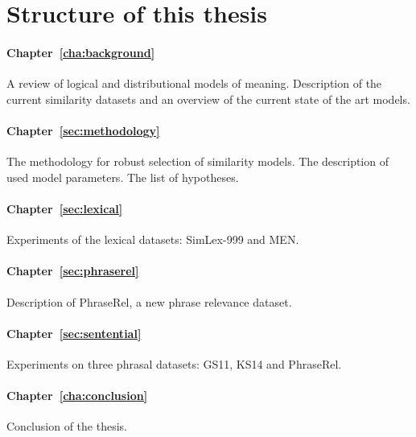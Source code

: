 \section{Structure of this thesis}
\label{sec:structure}

\paragraph{Chapter~\ref{cha:background}} A review of logical and distributional models of meaning. Description of the current similarity datasets and an overview of the current state of the art models.

\paragraph{Chapter~\ref{sec:methodology}} The methodology for robust selection of similarity models. The description of used model parameters. The list of hypotheses.

\paragraph{Chapter~\ref{sec:lexical}} Experiments of the lexical datasets: SimLex-999 and MEN.

\paragraph{Chapter~\ref{sec:phraserel}} Description of PhraseRel, a new phrase relevance dataset.

\paragraph{Chapter~\ref{sec:sentential}} Experiments on three phrasal datasets: GS11, KS14 and PhraseRel.

\paragraph{Chapter~\ref{cha:conclusion}} Conclusion of the thesis.

